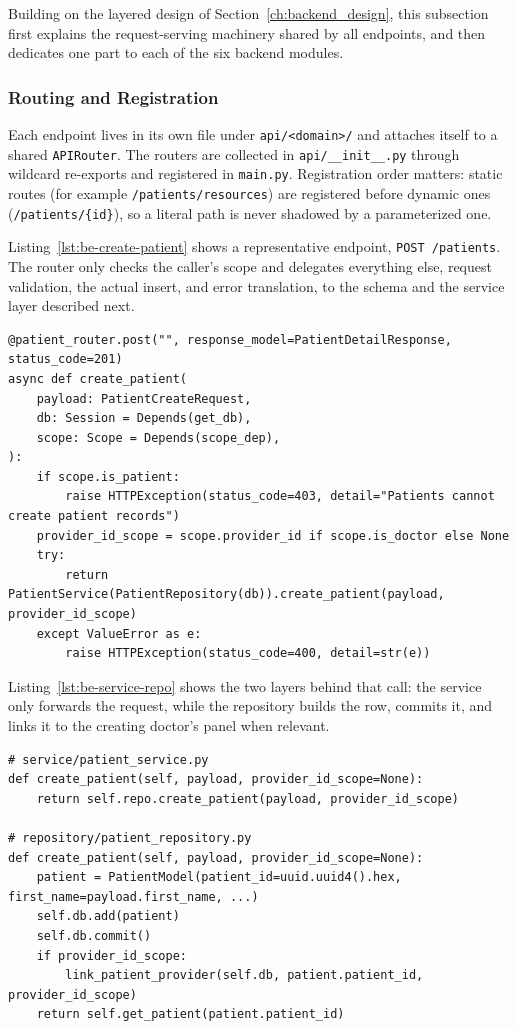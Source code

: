 Building on the layered design of Section~\ref{ch:backend_design}, this subsection first explains the request-serving machinery shared by all endpoints, and then dedicates one part to each of the six backend modules.

\subsubsection*{Routing and Registration}

Each endpoint lives in its own file under \texttt{api/<domain>/} and attaches itself to a shared \texttt{APIRouter}. The routers are collected in \texttt{api/\_\_init\_\_.py} through wildcard re-exports and registered in \texttt{main.py}. Registration order matters: static routes (for example \texttt{/patients/resources}) are registered before dynamic ones (\texttt{/patients/\{id\}}), so a literal path is never shadowed by a parameterized one.

Listing~\ref{lst:be-create-patient} shows a representative endpoint, \texttt{POST /patients}. The router only checks the caller's scope and delegates everything else, request validation, the actual insert, and error translation, to the schema and the service layer described next.

\begin{lstlisting}[style=pythonstyle, caption={A representative endpoint: creating a patient}, label={lst:be-create-patient}]
@patient_router.post("", response_model=PatientDetailResponse, status_code=201)
async def create_patient(
    payload: PatientCreateRequest,
    db: Session = Depends(get_db),
    scope: Scope = Depends(scope_dep),
):
    if scope.is_patient:
        raise HTTPException(status_code=403, detail="Patients cannot create patient records")
    provider_id_scope = scope.provider_id if scope.is_doctor else None
    try:
        return PatientService(PatientRepository(db)).create_patient(payload, provider_id_scope)
    except ValueError as e:
        raise HTTPException(status_code=400, detail=str(e))
\end{lstlisting}

\noindent Listing~\ref{lst:be-service-repo} shows the two layers behind that call: the service only forwards the request, while the repository builds the row, commits it, and links it to the creating doctor's panel when relevant.

\begin{lstlisting}[style=pythonstyle, caption={Service and repository layers backing \texttt{create\_patient}}, label={lst:be-service-repo}]
# service/patient_service.py
def create_patient(self, payload, provider_id_scope=None):
    return self.repo.create_patient(payload, provider_id_scope)

# repository/patient_repository.py
def create_patient(self, payload, provider_id_scope=None):
    patient = PatientModel(patient_id=uuid.uuid4().hex, first_name=payload.first_name, ...)
    self.db.add(patient)
    self.db.commit()
    if provider_id_scope:
        link_patient_provider(self.db, patient.patient_id, provider_id_scope)
    return self.get_patient(patient.patient_id)
\end{lstlisting}

